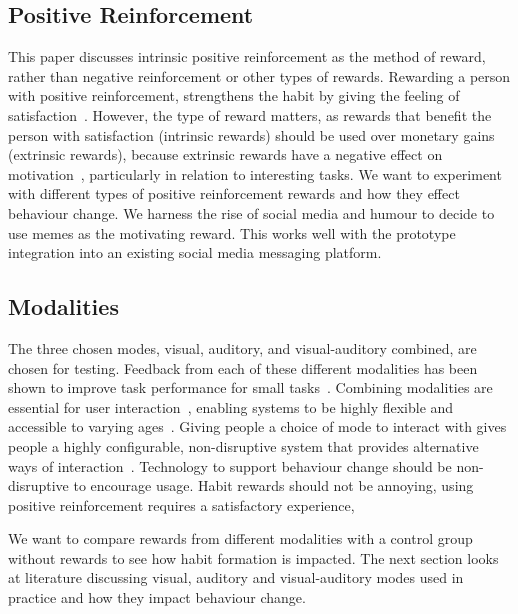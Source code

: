 \documentclass{scaffold/sigchi}
\begin{document}
\subsection{Positive Reinforcement}
This paper discusses intrinsic positive reinforcement as the method of reward, rather than negative reinforcement or other types of rewards. Rewarding a person with positive reinforcement, strengthens the habit by giving the feeling of satisfaction~\cite{article_promoting_habit_formation}. However, the type of reward matters, as rewards that benefit the person with satisfaction (intrinsic rewards) should be used over monetary gains (extrinsic rewards), because extrinsic rewards have a negative effect on motivation~\cite{article_meta_analytic_review_intrinsic_motivation}, particularly in relation to interesting tasks. We want to experiment with different types of positive reinforcement rewards and how they effect behaviour change. We harness the rise of social media and humour to decide to use memes as the motivating reward. This works well with the prototype integration into an existing social media messaging platform.


\subsection{Modalities}
The three chosen modes, visual, auditory, and visual-auditory combined, are chosen for testing. Feedback from each of these different modalities has been shown to improve task performance for small tasks~\cite{chi_oussama_tap_the_shapetones}. Combining modalities are essential for user interaction~\cite{article_user_centred_multimodal_reminders}, enabling systems to be highly flexible and accessible to varying ages~\cite{article_user_centred_multimodal_reminders}. Giving people a choice of mode to interact with gives people a highly configurable, non-disruptive system that provides alternative ways of interaction~\cite{article_designing_multimodal_reminders_for_home, multi_modal_reminders_less_disruptive}. Technology to support behaviour change should be non-disruptive to encourage usage. Habit rewards should not be annoying, using positive reinforcement requires a satisfactory experience,

We want to compare rewards from different modalities with a control group without rewards to see how habit formation is impacted. The next section looks at literature discussing visual, auditory and visual-auditory modes used in practice and how they impact behaviour change.
\end{document}

